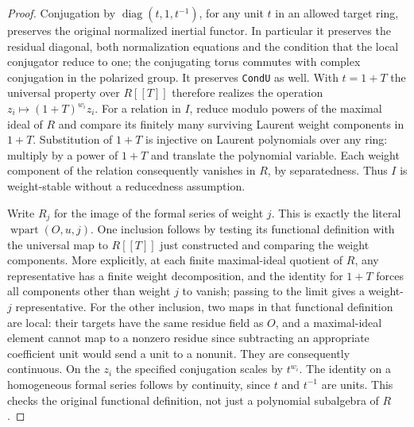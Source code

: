 \begin{proof}
Conjugation by $\operatorname{diag}(t,1,t^{-1})$, for any unit
$t$ in an allowed target ring, preserves the original
normalized inertial functor.  In particular it preserves the
residual diagonal, both normalization equations and the
condition that the local conjugator reduce to one; the
conjugating torus commutes with complex conjugation in the
polarized group.  It preserves \texttt{CondU} as well.
With $t=1+T$ the universal property over $R[[T]]$
therefore realizes the operation $z_i\mapsto(1+T)^{w_i}z_i$.
For a relation in $I$, reduce modulo powers of the maximal
ideal of $R$ and compare its finitely many surviving Laurent
weight components in $1+T$.  Substitution of $1+T$ is
injective on Laurent polynomials over any ring: multiply
by a power of $1+T$ and translate the polynomial variable.
Each weight component of the relation consequently vanishes
in $R$, by separatedness.  Thus $I$ is weight-stable without
a reducedness assumption.

Write $R_j$ for the image of the formal series of weight $j$.
This is exactly the literal $\operatorname{wpart}(O,u,j)$.
One inclusion follows by testing its functional definition
with the universal map to $R[[T]]$ just constructed and
comparing the weight components.  More explicitly, at each
finite maximal-ideal quotient of $R$, any representative
has a finite weight decomposition, and the identity for
$1+T$ forces all components other than weight $j$ to vanish;
passing to the limit gives a weight-$j$ representative.
For the other inclusion, two maps in that functional definition
are local: their targets have the same residue field as $O$,
and a maximal-ideal element cannot map to a nonzero residue
since subtracting an appropriate coefficient unit would send
a unit to a nonunit.  They are consequently continuous.
On the $z_i$ the specified conjugation scales by $t^{w_i}$.
The identity on a homogeneous formal series follows by
continuity, since $t$ and $t^{-1}$ are units.
This checks the original functional definition, not just a
polynomial subalgebra of $R$.


\end{proof}
